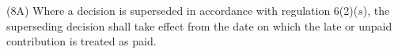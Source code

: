 \documentclass[12pt,a4paper]{article}
\begin{document}

(8A) Where a decision is superseded in accordance with regulation 6(2)($s$), the superseding decision shall take effect from the date on which the late or unpaid contribution is treated as paid.

%
%
\end{document}

